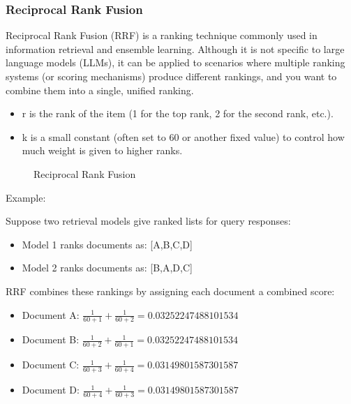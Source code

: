 \documentclass[letterpaper,11pt,english]{sphinxmanual}
\begin{document}
\subsubsection{Reciprocal Rank Fusion}
\label{\detokenize{rag:reciprocal-rank-fusion}}
\sphinxAtStartPar
Reciprocal Rank Fusion (RRF) is a ranking technique commonly used in information retrieval
and ensemble learning. Although it is not specific to large language models (LLMs), it can
be applied to scenarios where multiple ranking systems (or scoring mechanisms) produce
different rankings, and you want to combine them into a single, unified ranking.
\begin{description}
\begin{itemize}
\item {} 
\sphinxAtStartPar
r is the rank of the item (1 for the top rank, 2 for the second rank, etc.).

\item {} 
\sphinxAtStartPar
k is a small constant (often set to 60 or another fixed value) to control how much weight is given to higher ranks.

\end{itemize}

\end{description}

\begin{figure}[htbp]
\centering
\capstart

\noindent{}
\caption{Reciprocal Rank Fusion}\label{\detokenize{rag:id56}}\label{\detokenize{rag:fig-retriever}}\end{figure}

\sphinxAtStartPar
Example:

\sphinxAtStartPar
Suppose two retrieval models give ranked lists for query responses:
\begin{itemize}
\item {} 
\sphinxAtStartPar
Model 1 ranks documents as: {[}A,B,C,D{]}

\item {} 
\sphinxAtStartPar
Model 2 ranks documents as: {[}B,A,D,C{]}

\end{itemize}

\sphinxAtStartPar
RRF combines these rankings by assigning each document a combined score:
\begin{itemize}
\item {} 
\sphinxAtStartPar
Document A: \(\frac{1}{60+1} +\frac{1}{60+2}=0.03252247488101534\)

\item {} 
\sphinxAtStartPar
Document B: \(\frac{1}{60+2} +\frac{1}{60+1}=0.03252247488101534\)

\item {} 
\sphinxAtStartPar
Document C: \(\frac{1}{60+3} +\frac{1}{60+4}=0.03149801587301587\)

\item {} 
\sphinxAtStartPar
Document D: \(\frac{1}{60+4} +\frac{1}{60+3}=0.03149801587301587\)

\end{itemize}
\end{document}
